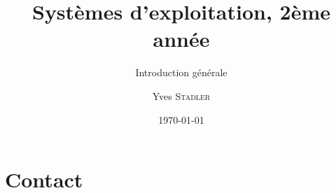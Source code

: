 
\title{Systèmes d'exploitation, 2ème année}
\subtitle{Introduction générale}

\author{Yves \textsc{Stadler}}

\date{\today}




\begin{frame}
\titlepage
\end{frame}


\def\sectitle{Contact}
\section{\sectitle}
